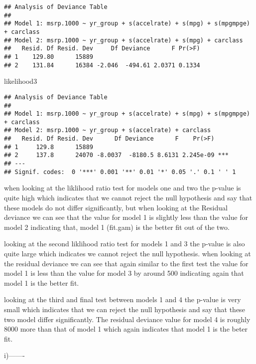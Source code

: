 \documentclass[]{article}
\newenvironment{Shaded}{\begin{snugshade}}{\end{snugshade}}
\newcommand{\NormalTok}[1]{#1}
\begin{document}
\begin{verbatim}
## Analysis of Deviance Table
## 
## Model 1: msrp.1000 ~ yr_group + s(accelrate) + s(mpg) + s(mpgmpge) + carclass
## Model 2: msrp.1000 ~ yr_group + s(accelrate) + s(mpg) + carclass
##   Resid. Df Resid. Dev     Df Deviance      F Pr(>F)
## 1    129.80      15889                              
## 2    131.84      16384 -2.046  -494.61 2.0371 0.1334
\end{verbatim}

\begin{Shaded}
\begin{Highlighting}[]
\NormalTok{likelihood3}
\end{Highlighting}
\end{Shaded}

\begin{verbatim}
## Analysis of Deviance Table
## 
## Model 1: msrp.1000 ~ yr_group + s(accelrate) + s(mpg) + s(mpgmpge) + carclass
## Model 2: msrp.1000 ~ yr_group + s(accelrate) + carclass
##   Resid. Df Resid. Dev      Df Deviance      F    Pr(>F)    
## 1     129.8      15889                                      
## 2     137.8      24070 -8.0037  -8180.5 8.6131 2.245e-09 ***
## ---
## Signif. codes:  0 '***' 0.001 '**' 0.01 '*' 0.05 '.' 0.1 ' ' 1
\end{verbatim}

when looking at the liklihood ratio test for models one and two the
p-value is quite high which indicates that we cannot reject the null
hypothesis and say that these models do not differ significantly, but
when looking at the Residual deviance we can see that the value for
model 1 is slightly less than the value for model 2 indicating that,
model 1 (fit.gam) is the better fit out of the two.

looking at the second liklihood ratio test for models 1 and 3 the
p-value is also quite large which indicates we cannot reject the null
hypothesis. when looking at the residual deviance we can see that again
similar to the first test the value for model 1 is less than the value
for model 3 by around 500 indicating again that model 1 is the better
fit.

looking at the third and final test between models 1 and 4 the p-value
is very small which indicates that we can reject the null hypothesis and
say that these two model differ significantly. The residual deviance
value for model 4 is roughly 8000 more than that of model 1 which again
indicates that model 1 is the beter fit.

i)-------
\end{document}
